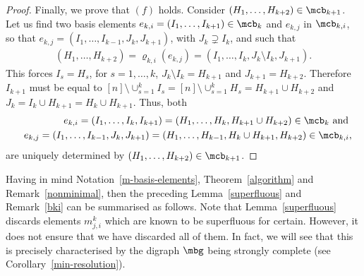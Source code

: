\begin{proof}
Finally, we prove that $(f)$ holds. Consider $(H_1,\ldots
,H_{k+2})\in\mcb_{k+1}$. Let us find two basis elements
$e_{k,i}=(I_1,\ldots ,I_{k+1})\in\mcb_k$ and $e_{k,j}$ in
$\mcb_{k,i}$, so that $e_{k,j}=(I_1,\ldots ,I_{k-1},J_k,J_{k+1})$,
with $J_k\supsetneq I_k$, and such that
\begin{eqnarray*}
(H_1,\ldots ,H_{k+2})=\varrho_{k,i}(e_{k,j})=(I_1,\ldots
  ,I_k,J_k\setminus I_k,J_{k+1}).
\end{eqnarray*}
This forces $I_{s}=H_s$, for $s=1,\ldots ,k$, $J_{k}\setminus
I_k=H_{k+1}$ and $J_{k+1}=H_{k+2}$.  Therefore $I_{k+1}$ must be equal
to $[n]\setminus \cup_{s=1}^kI_s=[n]\setminus \cup_{s=1}^kH_s=H_{k+1}\cup
H_{k+2}$ and $J_k=I_k\cup H_{k+1}=H_k\cup H_{k+1}$.  Thus, both
\begin{eqnarray*}
&& e_{k,i}=(I_1,\ldots ,I_k,I_{k+1})=(H_1,\ldots ,H_k,H_{k+1}\cup
H_{k+2})\in\mcb_k\mbox{ and }\\ && e_{k,j}=(I_1,\ldots
,I_{k-1},J_k,J_{k+1})=(H_1,\ldots ,H_{k-1},H_{k}\cup
H_{k+1},H_{k+2})\in\mcb_{k,i},
\end{eqnarray*}
are uniquely determined by $(H_1,\ldots ,H_{k+2})\in\mcb_{k+1}$.
\end{proof}

Having in mind Notation~\ref{m-basis-elements},
Theorem~\ref{algorithm} and Remark~\ref{nonminimal}, then the
preceding Lemma~\ref{superfluous} and Remark~\ref{bki} can be
summarised as follows. Note that Lemma~\ref{superfluous} discards
elements $m^k_{j,i}$ which are known to be superfluous for
certain. However, it does not ensure that we have discarded all of
them. In fact, we will see that this is precisely characterised by the
digraph $\mbg$ being strongly complete (see
Corollary~\ref{min-resolution}).


